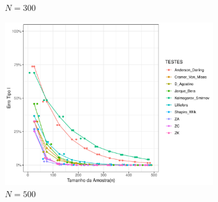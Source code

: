 \documentclass[final]{beamer}
\begin{document}
\begin{frame}[t]
\begin{columns}[t,totalwidth=0.6\paperwidth]
\begin{column}{0.45\textwidth}
\begin{figure}[H]
    \begin{subfigure}[b]{0.32\textwidth}
        \centering
        \caption{\(N = 300\)}
    \end{subfigure}
    \hfill
    \begin{subfigure}[b]{0.32\textwidth}
        \centering
        \includegraphics[height=10Cm,keepaspectratio]{Distribuição_Beta/Erro_TipoI/erro_tipo_I_beta_500.pdf}
        \caption{\(N = 500\)}
    \end{subfigure}
    \hfill
    \begin{subfigure}[b]{0.32\textwidth}

\end{subfigure}
\end{figure}
\end{column}
\end{columns}
\end{frame}
\end{document}
